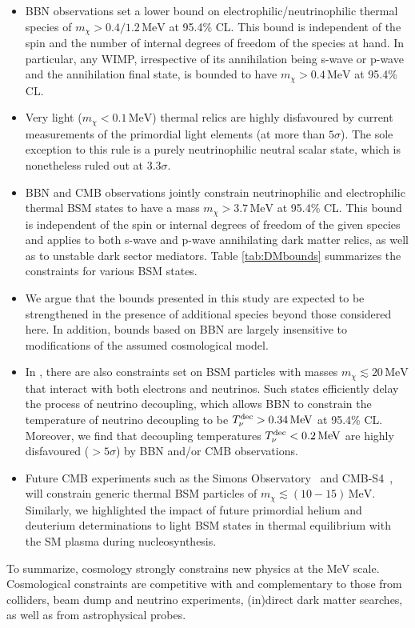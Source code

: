 \begin{itemize}[leftmargin=0.6cm,itemsep=2pt] 
\item BBN observations set a lower bound on electrophilic/neutrinophilic thermal species of $m_\chi > 0.4/1.2 \,\text{MeV}$ at 95.4\% CL. This bound is independent of the spin and the number of internal degrees of freedom of the species at hand. In particular, any WIMP, irrespective of its annihilation being s-wave or p-wave and the annihilation final state, is bounded to have $m_\chi > 0.4\,\text{MeV}$ at 95.4\% CL.


\item Very light ($m_\chi < 0.1\,\text{MeV}$) thermal relics are highly disfavoured by current measurements of the primordial light elements (at more than $5\sigma$). The sole exception to this rule is a purely neutrinophilic neutral scalar state, which is nonetheless ruled out at $3.3\sigma$. 

\item BBN and CMB observations jointly constrain neutrinophilic and electrophilic thermal BSM states to have a mass $m_\chi > 3.7\,\text{MeV}$ at 95.4\% CL. This bound is independent of the spin or internal degrees of freedom of the given species and applies to both s-wave and p-wave annihilating dark matter relics, as well as to unstable dark sector mediators. Table \ref{tab:DMbounds} summarizes the constraints for various BSM states.

\item We argue that the bounds presented in this study are expected to be strengthened in the presence of additional species beyond those considered here. In addition, bounds based on BBN are largely insensitive to modifications of the assumed cosmological model.

\item In \cite{Sabti:2019mhn}, there are also constraints set on BSM particles with masses $m_\chi \lesssim 20 \,\text{MeV}$ that interact with both electrons and neutrinos. Such states efficiently delay the process of neutrino decoupling, which allows BBN to constrain the temperature of neutrino decoupling to be $T_{\nu} ^{\rm dec} > 0.34\,\text{MeV}$ at 95.4\% CL. Moreover, we find that decoupling temperatures $T_{\nu} ^{\rm dec} < 0.2 \,\text{MeV}$ are highly disfavoured ($> 5\sigma$) by BBN and/or CMB observations.

\item Future CMB experiments such as the Simons Observatory~\cite{Ade:2018sbj} and CMB-S4~\cite{Abazajian:2016yjj,Abazajian:2019eic}, will constrain generic thermal BSM particles of $m_\chi \lesssim (10-15)\,\text{MeV}$. Similarly, we highlighted the impact of future primordial helium and deuterium determinations to light BSM states in thermal equilibrium with the SM plasma during nucleosynthesis. 
\end{itemize}


\noindent To summarize, cosmology strongly constrains new physics at the MeV scale. Cosmological constraints are competitive with and complementary to those from  colliders, beam dump and neutrino experiments, (in)direct dark matter searches, as well as from astrophysical probes. 